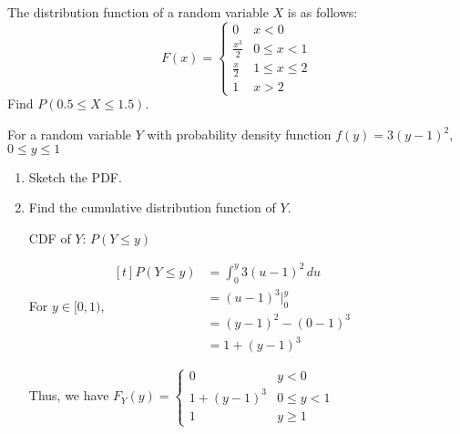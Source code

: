 \begin{example}
    The distribution function of a random variable $X$ is as follows: $$F(x) = \begin{cases} 0 & x < 0 \\ \frac{x^3}{2} & 0 \le x < 1 \\ \frac{x}{2} & 1 \le x \le 2 \\ 1 & x > 2 \end{cases}$$ Find $P(0.5 \le X \le 1.5)$.

\end{example}

\begin{example}
    For a random variable $Y$ with probability density function $f(y) = 3(y - 1)^2$, $0 \le y \le 1$

    \begin{enumerate}[label=\alph*)]
        \item Sketch the PDF.

        \begin{center}
            \begin{tikzpicture}
            \end{tikzpicture}
        \end{center}
        
        
        \item Find the cumulative distribution function of $Y$.
        
        CDF of $Y$: $P(Y \le y)$

        For $y \in [0, 1)$, $\begin{aligned}[t]
            P(Y \le y) & = \int_0^y 3(u - 1)^2 \,du \\
                       & = (u - 1)^3 \bigg|_0^y \\
                       & = (y - 1)^2 - (0 - 1)^3 \\
                       & = 1 + (y - 1)^3
        \end{aligned}$

        Thus, we have $F_Y(y) = \begin{cases} 0 & y < 0 \\ 1 + (y - 1)^3 & 0 \le y < 1 \\ 1 & y \ge 1 \end{cases}$

    \end{enumerate}
\end{example}

